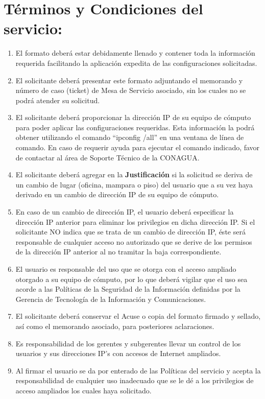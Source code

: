 \documentclass[letterpaper,9pt]{article}
\begin{document}
\section*{Términos y Condiciones del servicio:}
{\small \begin{enumerate}
	\item 	El formato deberá estar debidamente llenado y contener toda la información requerida facilitando la aplicación expedita de las configuraciones solicitadas.
	\item 	El solicitante deberá presentar este formato adjuntando el memorando y número de caso (ticket) de Mesa de Servicio asociado, sin los cuales no se podrá atender su solicitud.         
	\item  	El solicitante deberá proporcionar la dirección IP de su equipo de cómputo para poder aplicar las configuraciones requeridas. Esta información la podrá obtener utilizando el comando “ipconfig /all” en una ventana de línea de comando. En caso de requerir ayuda para ejecutar el comando indicado, favor de contactar al área de Soporte Técnico de la CONAGUA.
	\item 	El solicitante deberá agregar en la \textbf {Justificación} si la solicitud se deriva de un cambio de lugar (oficina, mampara o piso) del usuario que a su vez haya derivado en un cambio de dirección IP de su equipo de cómputo.
	\item  	En caso de un cambio de dirección IP, el usuario deberá especificar la dirección IP anterior para eliminar los privilegios en dicha dirección IP. Si el solicitante NO indica que se trata de un cambio de dirección IP, éste será responsable de cualquier acceso no autorizado que se derive de los permisos de la dirección IP anterior al no tramitar la baja correspondiente.
	\item 	El usuario es responsable del uso que se otorga con el acceso ampliado otorgado a su equipo de cómputo, por lo que deberá vigilar que el uso sea acorde a las Políticas de la Seguridad de la Información definidas por la Gerencia de Tecnología de la Información y Comunicaciones.
	\item 	El solicitante deberá conservar el Acuse o copia del formato firmado y sellado, así como el memorando asociado, para posteriores aclaraciones.
	\item  	Es responsabilidad de los gerentes y subgerentes llevar un control de los usuarios y sus direcciones IP’s con accesos de Internet ampliados.
	\item 	Al firmar el usuario se da por enterado de las Políticas del servicio y acepta la responsabilidad de cualquier uso inadecuado que se le dé a los privilegios de acceso ampliados los cuales haya solicitado.

\end{enumerate}}
\end{document}
